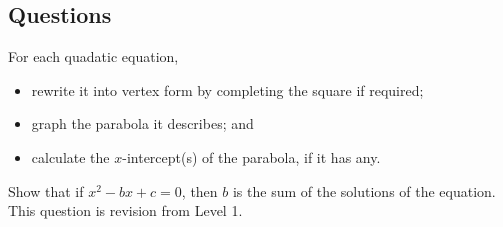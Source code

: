 \subsection*{Questions}
\begin{questions}
  \question For each quadatic equation,
            \begin{itemize}
              \item rewrite it into vertex form by completing the square if required;
              \item graph the parabola it describes; and
              \item calculate the $ x$-intercept(s) of the parabola, if it has any.
            \end{itemize}
  \question Show that if $ x^2 - bx + c = 0 $, then $ b $ is the sum of the solutions of the equation.
  \question This question is revision from Level 1.
\end{questions}
